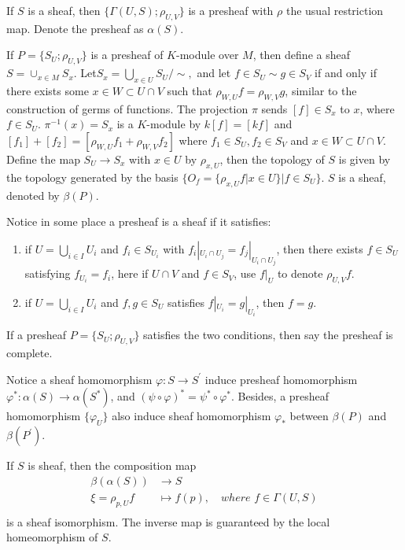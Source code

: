\documentclass[twoside]{article}
\begin{document}
If $S$ is a sheaf, then $\{\Gamma(U,S);\rho_{U,V}\}$ is a presheaf with $\rho$ the usual restriction map. Denote the presheaf as $\alpha(S)$.

If $P=\{S_U;\rho_{U,V}\}$ is a presheaf of $K$-module over $M$, then  define a sheaf $S=\cup_{x\in M} S_x$. Let$S_x=\bigcup_{x\in U}S_U/\sim,$ and let $f\in S_U\sim g\in S_V$ if and only if there exists some $x\in W\subset U\cap V$ such that $\rho_{W,U}f=\rho_{W,V}g$, similar to the construction of germs of functions.  The projection $\pi$ sends $[f]\in S_x$ to $x$, where $f\in S_U$. $\pi^{-1}(x)=S_x$ is a $K$-module by $k[f]=[kf]$ and $[f_1]+[f_2]=[\rho_{W,U}f_1+\rho_{W,V}f_2]$ where $f_1\in S_U,f_2\in S_V$ and $x\in W\subset U\cap V$. Define the map $S_U\to S_x$ with $x\in U$ by  $\rho_{x,U}$, then the topology of $S$ is given by the topology generated by the basis $\{O_f=\{\rho_{x,U}f|x\in U\}   |f\in S_U\}$. $S$ is a sheaf, denoted   by $\beta(P)$.



Notice in some place  a presheaf is a sheaf if it satisfies:

\begin{enumerate}
  \item if $U=\bigcup_{i\in I} U_i$ and $f_i\in S_{U_i}$ with $f_i|_{U_i\cap U_j}=f_j|_{U_i\cap U_j}$, then there exists  $f\in S_U$ satisfying $f_{U_i}=f_i$, here if $U\cap V$ and $f\in S_V$,  use $f|_{U} $ to denote $\rho_{U,V}f$.
  \item if $U=\bigcup_{i\in I} U_i$ and  $f,g\in S_U$ satisfies $f|_{U_i}=g|_{U_i}$, then $f=g$.
\end{enumerate}


If a presheaf $P=\{S_U;\rho_{U,V}\}$  satisfies the two conditions, then  say the presheaf is complete.

Notice a sheaf homomorphism $\varphi:S\to S^\prime$ induce presheaf homomorphism $\varphi^*:\alpha(S)\to \alpha(S^*)$,  and $(\psi\circ \varphi)^*=\psi^*\circ \varphi^*$. Besides, a presheaf homomorphism $\{\varphi_U\}$  also induce sheaf homomorphism $\varphi_*$ between $\beta(P)$ and $\beta(P^\prime)$.

If $S$ is sheaf, then the composition map  $$\begin{aligned}
\beta(\alpha(S))&\to S\\
\xi=\rho_{p,U}f&\mapsto f(p),\quad  where \,\, f\in \Gamma(U,S)\\
\end{aligned}
$$
 is a sheaf isomorphism. The inverse map is guaranteed by the local homeomorphism of $S$.
\end{document}
